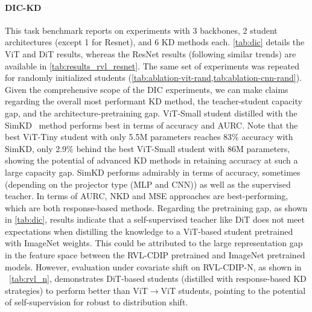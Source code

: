\documentclass[runningheads]{llncs}
\begin{document}
\paragraph{DIC-KD} This task benchmark reports on experiments with 3 backbones, 2 student architectures (except 1 for Resnet), and 6 KD methods each. \cref{tab:dic} details the ViT and DiT results, whereas the ResNet results (following similar trends) are available in \cref{tab:results_rvl_resnet}.
The same set of experiments was repeated for randomly initialized students (\cref{tab:ablation-vit-rand,tab:ablation-cnn-rand}).
Given the comprehensive scope of the DIC experiments, we can make claims regarding the overall most performant KD method, the teacher-student capacity gap, and the architecture-pretraining gap.
ViT-Small student distilled with the SimKD~\cite{SimKD} method performs best in terms of accuracy and AURC. Note that the best ViT-Tiny student with only 5.5M parameters reaches 83\% accuracy with SimKD, only 2.9\% behind the best ViT-Small student with 86M parameters, showing the potential of advanced KD methods in retaining accuracy at such a large capacity gap.
SimKD performs admirably in terms of accuracy, sometimes (depending on the projector type (MLP and CNN)) as well as the supervised teacher. In terms of AURC, NKD and MSE approaches are best-performing, which are both response-based methods. 
Regarding the pretraining gap, as shown in \cref{tab:dic}, results indicate that a self-supervised teacher like DiT does not meet expectations when distilling the knowledge to a ViT-based student pretrained with ImageNet weights. This could be attributed to the large representation gap in the feature space between the RVL-CDIP pretrained and ImageNet pretrained models. However, evaluation under covariate shift on RVL-CDIP-N, as shown in ~\cref{tab:rvl_n}, demonstrates DiT-based students (distilled with response-based KD strategies) to perform better than ViT$\to$ViT students, pointing to the potential of self-supervision for robust to distribution shift.
\end{document}
